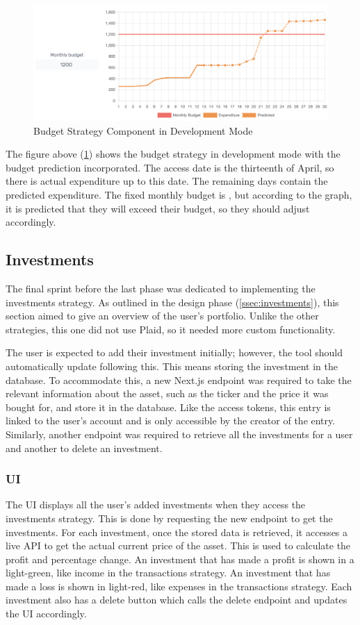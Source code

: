 \begin{figure}[H]
	\centering
	\includegraphics[width=\textwidth]{images/budget_strategy.png}
	\caption{Budget Strategy Component in Development Mode}
	\label{fig:BudgetStrategy}
\end{figure}

The figure above (\ref{fig:BudgetStrategy}) shows the budget strategy in development mode with the budget prediction incorporated. The access date is the thirteenth of April, so there is actual expenditure up to this date. The remaining days contain the predicted expenditure. The fixed monthly budget is , but according to the graph, it is predicted that they will exceed their budget, so they should adjust accordingly.

\subsection{Investments}
The final sprint before the last phase was dedicated to implementing the investments strategy. As outlined in the design phase (\ref{ssec:investments}), this section aimed to give an overview of the user's portfolio. Unlike the other strategies, this one did not use Plaid, so it needed more custom functionality.

The user is expected to add their investment initially; however, the tool should automatically update following this. This means storing the investment in the database. To accommodate this, a new Next.js endpoint was required to take the relevant information about the asset, such as the ticker and the price it was bought for, and store it in the database. Like the access tokens, this entry is linked to the user's account and is only accessible by the creator of the entry. Similarly, another endpoint was required to retrieve all the investments for a user and another to delete an investment.

\subsubsection{UI}
The UI displays all the user's added investments when they access the investments strategy. This is done by requesting the new endpoint to get the investments. For each investment, once the stored data is retrieved, it accesses a live API to get the actual current price of the asset. This is used to calculate the profit and percentage change. An investment that has made a profit is shown in a light-green, like income in the transactions strategy. An investment that has made a loss is shown in light-red, like expenses in the transactions strategy. Each investment also has a delete button which calls the delete endpoint and updates the UI accordingly.

